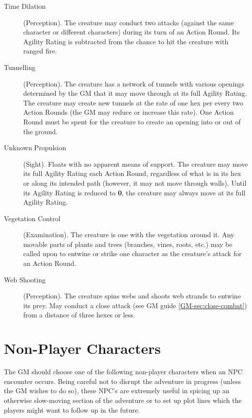\begin{description}
\item[Time Dilation] (Perception). The creature may conduct two
  attacks (against the same character or different characters) during
  its turn of an Action Round. Its Agility Rating is subtracted from the
  chance to hit the creature with ranged fire.

\item[Tunnelling] (Perception). The creature has a network of
  tunnels with various openings determined by the GM that it may move
  through at its full Agility Rating. The creature may create new
  tunnels at the rate of one hex per every two Action Rounds (the GM may
  reduce or increase this rate). One Action Round must be spent for the
  creature to create an opening into or out of the ground.

\item[Unknown Propulsion] (Sight). Floats with no apparent means of
  support. The creature may move its full Agility Rating each Action
  Round, regardless of what is in its hex or along its intended path
  (however, it may not move through walls). Until its Agility Rating is
  reduced to \textbf{0}, the creature may always move at its full Agility Rating.

\item[Vegetation Control] (Examination). The creature is one with
  the vegetation around it. Any movable parts of plants and trees
  (branches, vines, roots, etc.) may be called upon to entwine or strike
  one character as the creature's attack for an Action Round.

\item[Web Shooting] (Perception). The creature spins webs and shoots
  web strands to entwine its prey. May conduct a close attack (see GM
  guide \ref{GM-sec:close-combat}) from a distance of three hexes or
  less.
\end{description}

\section{Non-Player Characters}
\label{sec:non-play-char}

The GM should choose one of the following non-player characters when
an NPC encounter occurs. Being careful not to disrupt the adventure in
progress (unless the GM wishes to do so), these NPC's are extremely
useful in spicing up an otherwise slow-moving section of the adventure
or to set up plot lines which the players might want to follow up in
the future.

